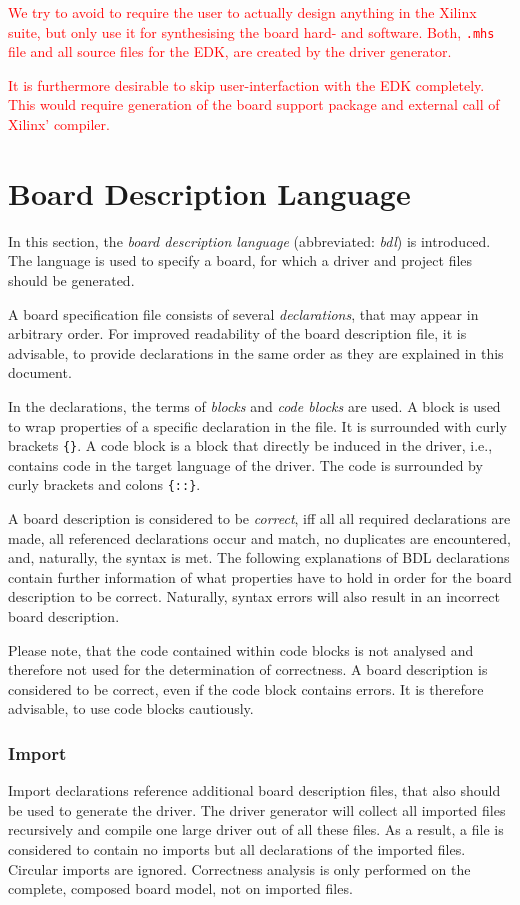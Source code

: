 \documentclass{report}
\begin{document}
 \textcolor{red}{We try to avoid to require the user to actually design anything in the Xilinx suite, but only use it for synthesising the board hard- and software. Both, \texttt{.mhs} file and all source files for the EDK, are created by the driver generator.}

\textcolor{red}{It is furthermore desirable to skip user-interfaction with the EDK completely. This would require generation of the board support package and external call of Xilinx' compiler.}

\section{Board Description Language}
\label{sec:bdl}
In this section, the \textit{board description language} (abbreviated: \textit{bdl}) is introduced. The language is used to specify a board, for which a driver and project files should be generated. 

A board specification file consists of several \textit{declarations}, that may appear in arbitrary order. For improved readability of the board description file, it is advisable, to provide declarations in the same order as they are explained in this document.

In the declarations, the terms of \textit{blocks} and \textit{code blocks} are used. A block is used to wrap properties of a specific declaration in the file. It is surrounded with curly brackets \texttt{\{\}}.
A code block is a block that directly be induced in the driver, i.e., contains code in the target language of the driver. The code is surrounded by curly brackets and colons \texttt{\{::\}}.

A board description is considered to be \textit{correct}, iff all all required declarations are made, all referenced declarations occur and match, no duplicates are encountered, and, naturally, the syntax is met. The following explanations of BDL declarations contain further information of what properties have to hold in order for the board description to be correct. Naturally, syntax errors will also result in an incorrect board description.

Please note, that the code contained within code blocks is not analysed and therefore not used for the determination of correctness. A board description is considered to be correct, even if the code block contains errors. It is therefore advisable, to use code blocks cautiously.

\subsubsection{Import}
Import declarations reference additional board description files, that also should be used to generate the driver. The driver generator will collect all imported files recursively and compile one large driver out of all these files. As a result, a file is considered to contain no imports but all declarations of the imported files. Circular imports are ignored. Correctness analysis is only performed on the complete, composed board model, not on imported files. 
\end{document}

